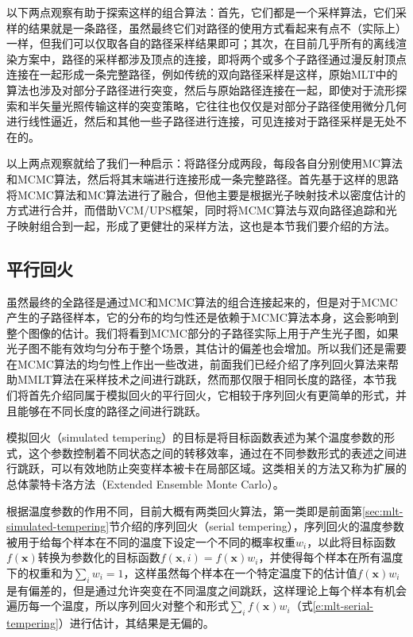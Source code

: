 以下两点观察有助于探索这样的组合算法：首先，它们都是一个采样算法，它们采样的结果就是一条路径，虽然最终它们对路径的使用方式看起来有点不（实际上）一样，但我们可以仅取各自的路径采样结果即可；其次，在目前几乎所有的离线渲染方案中，路径的采样都涉及顶点的连接，即将两个或多个子路径通过漫反射顶点连接在一起形成一条完整路径，例如传统的双向路径采样是这样，原始MLT中的算法也涉及对部分子路径进行突变，然后与原始路径连接在一起，即使对于流形探索和半矢量光照传输这样的突变策略，它往往也仅仅是对部分子路径使用微分几何进行线性逼近，然后和其他一些子路径进行连接，可见连接对于路径采样是无处不在的。

以上两点观察就给了我们一种启示：将路径分成两段，每段各自分别使用MC算法和MCMC算法，然后将其末端进行连接形成一条完整路径。\cite{a:RobustAdaptivePhotonTracingusingPhotonPathVisibility}首先基于这样的思路将MCMC算法和MC算法进行了融合，但他主要是根据光子映射技术以密度估计的方式进行合并，而借助VCM/UPS框架，\cite{a:RobustLightTransportSimulationviaMetropolisedBidirectionalEstimators}同时将MCMC算法与双向路径追踪和光子映射组合到一起，形成了更健壮的采样方法，这也是本节我们要介绍的方法。





\subsection{平行回火}
虽然最终的全路径是通过MC和MCMC算法的组合连接起来的，但是对于MCMC产生的子路径样本，它的分布的均匀性还是依赖于MCMC算法本身，这会影响到整个图像的估计。我们将看到MCMC部分的子路径实际上用于产生光子图，如果光子图不能有效均匀分布于整个场景，其估计的偏差也会增加。所以我们还是需要在MCMC算法的均匀性上作出一些改进，前面我们已经介绍了序列回火算法来帮助MMLT算法在采样技术之间进行跳跃，然而那仅限于相同长度的路径，本节我们将首先介绍同属于模拟回火的平行回火，它相较于序列回火有更简单的形式，并且能够在不同长度的路径之间进行跳跃。

模拟回火（simulated tempering）的目标是将目标函数表述为某个温度参数的形式，这个参数控制着不同状态之间的转移效率，通过在不同参数形式的表述之间进行跳跃，可以有效地防止突变样本被卡在局部区域。这类相关的方法又称为扩展的总体蒙特卡洛方法（Extended Ensemble Monte Carlo）\cite{a:ExtendedEnsembleMonteCarlo}。

根据温度参数的作用不同，目前大概有两类回火算法，第一类即是前面第\ref{sec:mlt-simulated-tempering}节介绍的序列回火（serial tempering），序列回火的温度参数被用于给每个样本在不同的温度下设定一个不同的概率权重$w_i$，以此将目标函数$f(\mathbf{x})$转换为参数化的目标函数$f(\mathbf{x},i)=f(\mathbf{x})w_i$，并使得每个样本在所有温度下的权重和为$\sum_i w_i=1$，这样虽然每个样本在一个特定温度下的估计值$f(\mathbf{x})w_i$是有偏差的，但是通过允许突变在不同温度之间跳跃，这样理论上每个样本有机会遍历每一个温度，所以序列回火对整个和形式$\sum_if(\mathbf{x})w_i$（式\ref{e:mlt-serial-tempering}）进行估计，其结果是无偏的。

